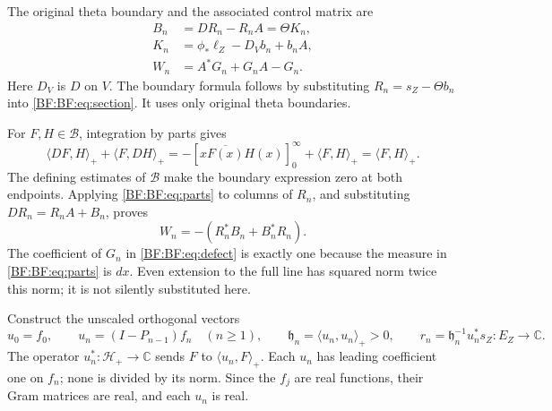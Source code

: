 The original theta boundary and the associated control matrix are
\begin{equation}
\begin{split}
B_n&=DR_n-R_nA=\Theta K_n,\\
K_n&=\phi_*\ell_Z-D_Vb_n+b_nA,\\
W_n&=A^*G_n+G_nA-G_n.
\end{split}
\tag{BF.10}\label{BF:BF:eq:defect}
\end{equation}
Here \(D_V\) is \(D\) on \(V\).  The boundary formula follows by
substituting \(R_n=s_Z-\Theta b_n\) into
\eqref{BF:BF:eq:section}.  It uses only original theta boundaries.

For \(F,H\in\mathcal B\), integration by parts gives
\begin{equation}
\langle DF,H\rangle_++\langle F,DH\rangle_+
=-\left[x\overline{F(x)}H(x)\right]_{0}^{\infty}
 +\langle F,H\rangle_+
=\langle F,H\rangle_+.
\tag{BF.11}\label{BF:BF:eq:parts}
\end{equation}
The defining estimates of \(\mathcal B\) make the boundary expression
zero at both endpoints.  Applying \eqref{BF:BF:eq:parts} to columns of
\(R_n\), and substituting \(DR_n=R_nA+B_n\), proves
\begin{equation}
W_n=-(R_n^*B_n+B_n^*R_n).
\tag{BF.12}\label{BF:BF:eq:cross-defect}
\end{equation}
The coefficient of \(G_n\) in \eqref{BF:BF:eq:defect} is exactly one
because the measure in \eqref{BF:BF:eq:parts} is \(dx\).
Even extension to the full line has squared norm twice this norm;
it is not silently substituted here.

Construct the unscaled orthogonal vectors
\begin{equation}
u_0=f_0,\qquad
u_n=(I-P_{n-1})f_n\quad(n\ge1),\qquad
\mathfrak h_n=\langle u_n,u_n\rangle_+>0,\qquad
r_n=\mathfrak h_n^{-1}u_n^*s_Z:E_Z\to\mathbb C.
\tag{BF.13}\label{BF:BF:eq:unscaled-rows}
\end{equation}
The operator \(u_n^*:\mathcal H_+\to\mathbb C\) sends \(F\) to
\(\langle u_n,F\rangle_+\).  Each \(u_n\) has leading coefficient
one on \(f_n\); none is divided by its norm.  Since the \(f_j\) are
real functions, their Gram matrices are real, and each \(u_n\) is
real.

